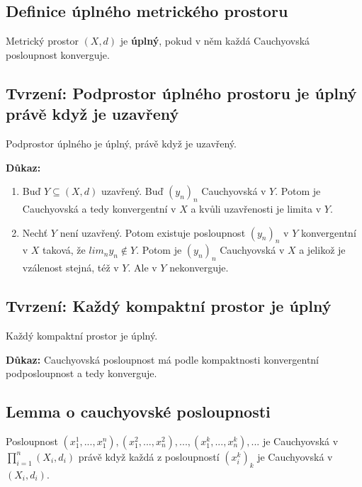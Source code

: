 \documentclass[../main.tex]{subfiles}
\begin{document}
\subsection{Definice úplného metrického prostoru}
\hspace{1.2mm}
\noindent
Metrický prostor $(X,d)$ je \textbf{úplný}, pokud v něm každá Cauchyovská posloupnost konverguje.

\subsection{Tvrzení: Podprostor úplného prostoru je úplný právě když je uzavřený}
\hspace{1.2mm}
\noindent
Podprostor úplného je úplný, právě když je uzavřený.

\vspace{5mm}
\noindent
\textbf{Důkaz:} 
\begin{enumerate}
    \item Buď $Y \subseteq (X,d)$ uzavřený. Buď $(y_n)_n$ Cauchyovská v $Y$. Potom je Cauchyovská 
    a tedy konvergentní v $X$ a kvůli uzavřenosti je limita v $Y$.
    \item Nechť $Y$ není uzavřený. Potom existuje posloupnost $(y_n)_n$ v $Y$ konvergentní v $X$ taková, že $lim_n y_n \notin Y$.
    Potom je $(y_n)_n$ Cauchyovská v $X$ a jelikož je vzálenost stejná, též v $Y$. Ale v $Y$ nekonverguje.
\end{enumerate}

\subsection{Tvrzení: Každý kompaktní prostor je úplný}
\hspace{1.2mm}
\noindent
Každý kompaktní prostor je úplný.

\vspace{5mm}
\noindent
\textbf{Důkaz:} Cauchyovská posloupnost má podle kompaktnosti konvergentní podposloupnost a tedy konverguje.

\subsection{Lemma o cauchyovské posloupnosti}
\hspace{1.2mm}
\noindent
Posloupnost $(x_{1}^{1}, ... , x_{1}^{n}), (x_{1}^{2},...,x_{n}^{2}), ...,(x_{1}^{k},...,x_{n}^{k}),...$
je Cauchyovská v $\prod_{i=1}^{n}(X_i, d_i)$ právě když každá z posloupností $(x_{i}^{k})_k$ je
Cauchyovská v $(X_i, d_i)$.
\end{document}
